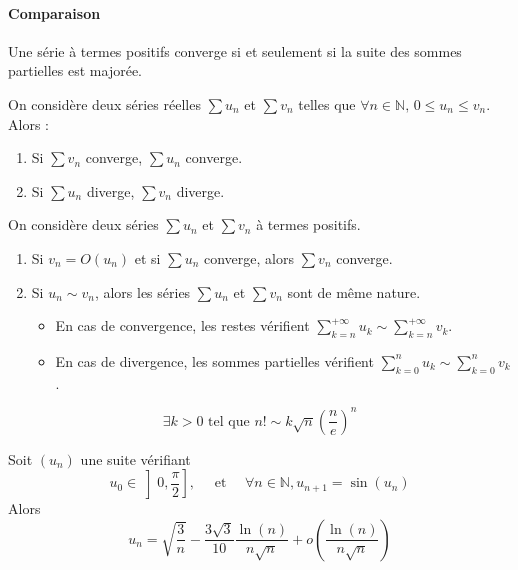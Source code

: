   \paragraph{Comparaison}

  \begin{proposition}
    Une série à termes positifs converge si et seulement si la suite des sommes partielles est majorée.
  \end{proposition}

  \begin{corollary}
    On considère deux séries réelles $\sum u_n$ et $\sum v_n$ telles que $\forall n \in \mathbb{N}, \, 0 \leq u_n \leq v_n$. Alors :
    \begin{enumerate}[label={\bfseries(\roman*)}]
      \item Si $\sum v_n$ converge, $\sum u_n$ converge.
      \item Si $\sum u_n$ diverge, $\sum v_n$ diverge.
    \end{enumerate}
  \end{corollary}

  \begin{proposition}
    On considère deux séries $\sum u_n$ et $\sum v_n$ à termes positifs.
    \begin{enumerate}[label={\bfseries(\roman*)}]
      \item Si $v_n = O(u_n)$ et si $\sum u_n$ converge, alors $\sum v_n$ converge.
      \item Si $u_n \sim v_n$, alors les séries $\sum u_n$ et $\sum v_n$ sont de même nature.
      \begin{itemize}
        \item En cas de convergence, les restes vérifient $\sum_{k=n}^{+\infty} u_k \sim \sum_{k=n}^{+\infty} v_k$.
        \item En cas de divergence, les sommes partielles vérifient $\sum_{k=0}^{n} u_k \sim \sum_{k=0}^{n} v_k$.
      \end{itemize}
    \end{enumerate}
  \end{proposition}


  \begin{application}
    \[ \exists k > 0 \text{ tel que } n! \sim k \sqrt{n} \left( \frac{n}{e} \right)^n \]
  \end{application}


  \begin{application}
    Soit $(u_n)$ une suite vérifiant
    \[ u_0 \in \left] 0, \frac{\pi}{2} \right], \quad \text{ et } \quad \forall n \in \mathbb{N}, u_{n+1} = \sin(u_n) \]
    Alors
    \[ u_n = \sqrt{\frac{3}{n}} - \frac{3\sqrt{3}}{10} \frac{\ln(n)}{n\sqrt{n}} + o \left( \frac{\ln(n)}{n\sqrt{n}} \right) \]
  \end{application}

